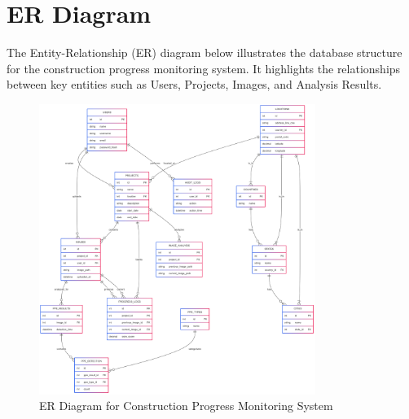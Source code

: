 \documentclass[12pt,a4paper]{report}
\begin{document}
\section{ER Diagram}
The Entity-Relationship (ER) diagram below illustrates the database structure for the construction progress monitoring system. It highlights the relationships between key entities such as Users, Projects, Images, and Analysis Results.

\begin{figure}[H]
    \centering
    \includegraphics[width=0.8\textwidth]{images/mermaid-ai-diagram-2025-04-27-132345.png}
    \caption{ER Diagram for Construction Progress Monitoring System}
    \label{fig:er-diagram}
\end{figure}
\end{document}
